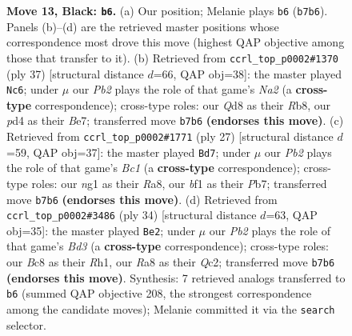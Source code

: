 \documentclass[11pt]{article}
\begin{document}
\begin{figure}[p]
\caption{\textbf{Move 13, Black: \texttt{b6}.} (a) Our position; Melanie plays \texttt{b6} (\texttt{b7b6}). Panels (b)--(d) are the retrieved master positions whose correspondence most drove this move (highest QAP objective among those that transfer to it). (b) Retrieved from \texttt{ccrl\_top\_p0002\#1370} (ply 37) [structural distance $d$=66, QAP obj=38]: the master played \texttt{Nc6}; under $\mu$ our \emph{Pb2} plays the role of that game's \emph{Na2} (a \textbf{cross-type} correspondence); cross-type roles: our \emph{Q}d8 as their \emph{R}b8, our \emph{p}d4 as their \emph{B}e7; transferred move \texttt{b7b6} \textbf{(endorses this move)}. (c) Retrieved from \texttt{ccrl\_top\_p0002\#1771} (ply 27) [structural distance $d$=59, QAP obj=37]: the master played \texttt{Bd7}; under $\mu$ our \emph{Pb2} plays the role of that game's \emph{Bc1} (a \textbf{cross-type} correspondence); cross-type roles: our \emph{n}g1 as their \emph{R}a8, our \emph{b}f1 as their \emph{P}b7; transferred move \texttt{b7b6} \textbf{(endorses this move)}. (d) Retrieved from \texttt{ccrl\_top\_p0002\#3486} (ply 34) [structural distance $d$=63, QAP obj=35]: the master played \texttt{Be2}; under $\mu$ our \emph{Pb2} plays the role of that game's \emph{Bd3} (a \textbf{cross-type} correspondence); cross-type roles: our \emph{B}c8 as their \emph{R}h1, our \emph{R}a8 as their \emph{Q}c2; transferred move \texttt{b7b6} \textbf{(endorses this move)}. Synthesis: 7 retrieved analogs transferred to \texttt{b6} (summed QAP objective 208, the strongest correspondence among the candidate moves); Melanie committed it via the \texttt{search} selector.}
\label{fig:thought-m25}
\end{figure}

\clearpage
\end{document}
